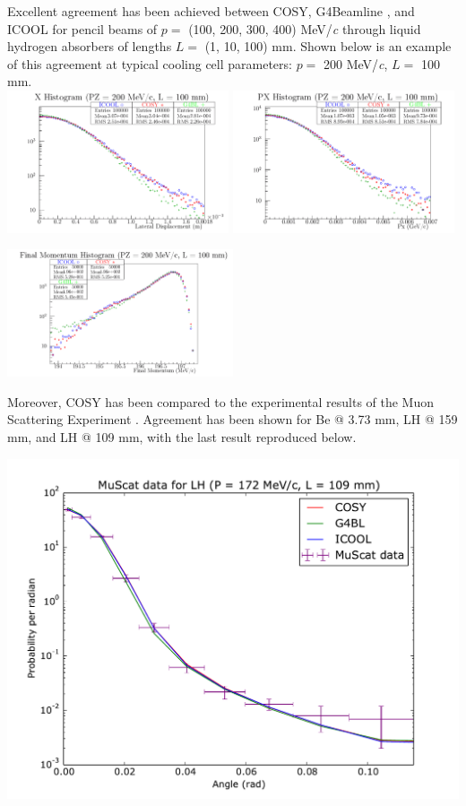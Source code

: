 \documentclass[portrait,a0paper,fontscale=0.285]{baposter} %
\begin{document}
\begin{poster}
{Excellent agreement has been achieved between COSY, G4Beamline \cite{g4bl}, and ICOOL \cite{icool} for pencil beams of $p =$ (100, 200, 300, 400) MeV/\textit{c} through liquid hydrogen absorbers of lengths $L =$ (1, 10, 100) mm. Shown below is an example of this agreement at typical cooling cell parameters: $p =$ 200 MeV/\textit{c}, $L =$ 100 mm.\\
\includegraphics[width=0.49\textwidth]{Figures/LH.X.200.100.png} \includegraphics[width=0.49\textwidth]{Figures/LH.PX.200.100.png}
\begin{center} \includegraphics[width=0.5\textwidth]{Figures/LH.strag.200.100.png} \end{center}

Moreover, COSY has been compared to the experimental results of the Muon Scattering Experiment \cite{muscat}. Agreement has been shown for Be @ 3.73 mm, LH @ 159 mm, and LH @ 109 mm, with the last result reproduced below.

\includegraphics[width=\textwidth]{Figures/172.109.muscat.pdf}
}


\end{poster}
\end{document}
